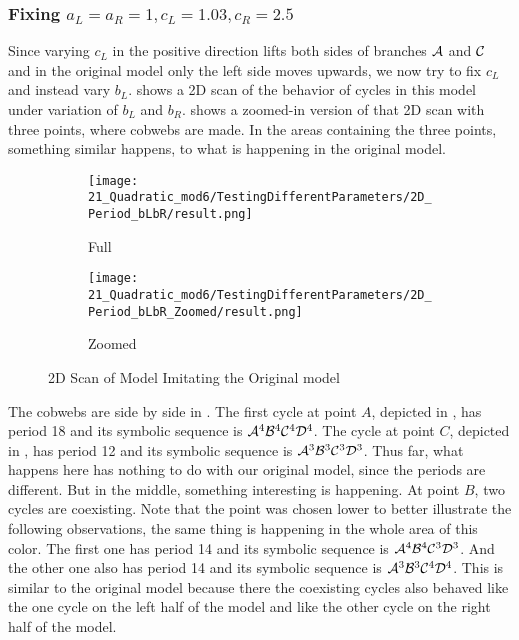 \subsubsection{Fixing $a_L = a_R = 1, c_L = 1.03, c_R = 2.5$}

Since varying $c_L$ in the positive direction lifts both sides of branches $\mathcal{A}$ and $\mathcal{C}$ and in the original model only the left side moves upwards, we now try to fix $c_L$ and instead vary $b_L$.
 shows a 2D scan of the behavior of cycles in this model under variation of $b_L$ and $b_R$.
 shows a zoomed-in version of that 2D scan with three points, where cobwebs are made.
In the areas containing the three points, something similar happens, to what is happening in the original model.

\begin{figure}
    \centering
    \begin{subfigure}{0.4\textwidth}
        \centering
        \texttt{[image: 21\_Quadratic\_mod6/TestingDifferentParameters/2D\_Period\_bLbR/result.png]}
        \caption{Full}
        \label{fig:quadratic.full.bLbR.2d.full}
    \end{subfigure}
    \begin{subfigure}{0.4\textwidth}
        \centering
        \texttt{[image: 21\_Quadratic\_mod6/TestingDifferentParameters/2D\_Period\_bLbR\_Zoomed/result.png]}
        \caption{Zoomed}
        \label{fig:quadratic.full.bLbR.2d.z}
    \end{subfigure}
    \caption{2D Scan of Model Imitating the Original model }
\end{figure}

The cobwebs are side by side in .
The first cycle at point $A$, depicted in , has period 18 and its symbolic sequence is $\mathcal{A}^4\mathcal{B}^4\mathcal{C}^4\mathcal{D}^4$.
The cycle at point $C$, depicted in , has period 12 and its symbolic sequence is $\mathcal{A}^3\mathcal{B}^3\mathcal{C}^3\mathcal{D}^3$.
Thus far, what happens here has nothing to do with our original model, since the periods are different.
But in the middle, something interesting is happening.
At point $B$, two cycles are coexisting.
Note that the point was chosen lower to better illustrate the following observations, the same thing is happening in the whole area of this color.
The first one has period 14 and its symbolic sequence is $\mathcal{A}^4\mathcal{B}^4\mathcal{C}^3\mathcal{D}^3$.
And the other one also has period 14 and its symbolic sequence is $\mathcal{A}^3\mathcal{B}^3\mathcal{C}^4\mathcal{D}^4$.
This is similar to the original model because there the coexisting cycles also behaved like the one cycle on the left half of the model and like the other cycle on the right half of the model.

